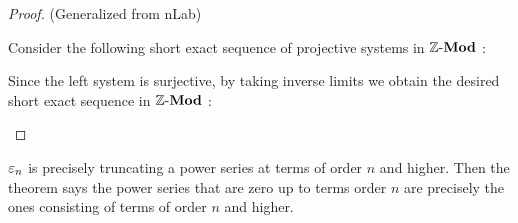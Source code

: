 \begin{proof}(Generalized from nLab)

  Consider the following short exact sequence 
  of projective systems in $\MOD[\Z]$ : 
  \begin{figure}[H]
    \centering
  \end{figure}
  Since the left system is surjective, 
  by taking inverse limits we obtain 
  the desired short exact sequence in $\MOD[\Z]$ : 
  \begin{figure}[H]
    \centering
  \end{figure}
\end{proof}

\begin{rmk}
  
  $\ep_n$ is precisely truncating a power series at 
  terms of order $n$ and higher.
  Then the theorem says the power series that are zero up to terms order $n$
  are precisely the ones consisting of terms of order $n$ and higher. 
\end{rmk}

